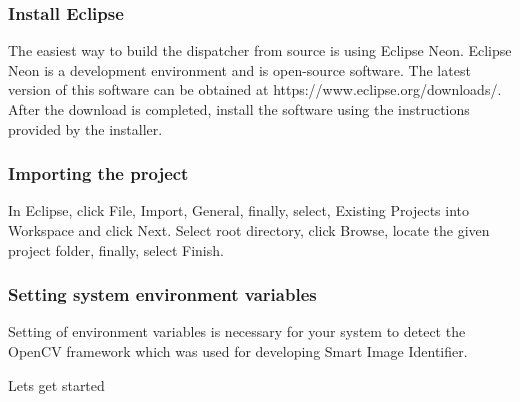 \documentclass[a4paper,12pt]{report}
\begin{document}
	\subsubsection{Install Eclipse}
	The easiest way to build the dispatcher from source is using Eclipse Neon. Eclipse Neon is a
	development environment and is open-source software. The latest version of this software can
	be obtained at https://www.eclipse.org/downloads/. After the download is completed, install
	the software using the instructions provided by the installer.
	
	\subsubsection{Importing the project}
	In Eclipse, click File, Import, General, finally, select, Existing Projects into Workspace and click
	Next. \newline\newline
	Select root directory, click Browse, locate the given project folder, finally, select Finish.
	
	\subsubsection{Setting system environment variables}
	Setting of environment variables is necessary for your system to detect the OpenCV framework
	which was used for developing Smart Image Identifier.
	
	\newpage
	Lets get started
	
\end{document}
